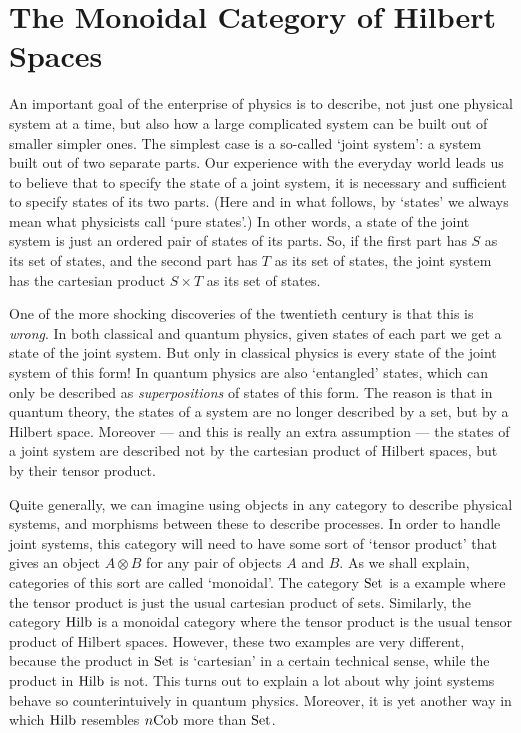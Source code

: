 \documentclass{article}
\newcommand{\Set}{{\rm Set}}
\newcommand{\Hilb}{{\rm Hilb}}
\newcommand{\Cob}{{\rm Cob}}
\newcommand{\tensor}{\otimes}
\begin{document}
\section{The Monoidal Category of Hilbert Spaces} 
\label{monoidal}

An important goal of the enterprise of physics is to describe, not
just one physical system at a time, but also how a large complicated
system can be built out of smaller simpler ones.  The simplest case is
a so-called `joint system': a system built out of two separate parts.
Our experience with the everyday world leads us to believe that to
specify the state of a joint system, it is necessary and sufficient to
specify states of its two parts.  (Here and in what follows, by
`states' we always mean what physicists call `pure states'.)  In other
words, a state of the joint system is just an ordered pair of states
of its parts.  So, if the first part has $S$ as its set of states, and
the second part has $T$ as its set of states, the joint system has the
cartesian product $S \times T$ as its set of states.
  
One of the more shocking discoveries of the twentieth century is that
this is {\it wrong}.  In both classical and quantum physics, given
states of each part we get a state of the joint system.  But only in
classical physics is every state of the joint system of this form!  In
quantum physics are also `entangled' states, which can only be
described as {\it superpositions} of states of this form.  The reason
is that in quantum theory, the states of a system are no longer
described by a set, but by a Hilbert space.  Moreover --- and this is
really an extra assumption --- the states of a joint system are
described not by the cartesian product of Hilbert spaces, but by their
tensor product.

Quite generally, we can imagine using objects in any category to
describe physical systems, and morphisms between these to describe
processes.  In order to handle joint systems, this category will need
to have some sort of `tensor product' that gives an object $A \tensor
B$ for any pair of objects $A$ and $B$.  As we shall explain,
categories of this sort are called `monoidal'.  The category $\Set$ is
a example where the tensor product is just the usual cartesian product
of sets.  Similarly, the category $\Hilb$ is a monoidal category where
the tensor product is the usual tensor product of Hilbert spaces.
However, these two examples are very different, because the product in
$\Set$ is `cartesian' in a certain technical sense, while the product
in $\Hilb$ is not.  This turns out to explain a lot about why joint
systems behave so counterintuively in quantum physics.  Moreover, it
is yet another way in which $\Hilb$ resembles $n\Cob$ more than
$\Set$.
\end{document}
